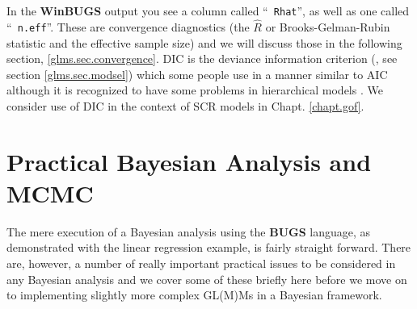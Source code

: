 


 In the {\bf WinBUGS} output you see a column called ``\mbox{\tt
   Rhat}'', as well as one called ``\mbox{\tt
   n.eff}''. These are convergence diagnostics (the $\hat{R}$ or Brooks-Gelman-Rubin statistic and the effective sample size) and we will discuss those in the following section, \ref{glms.sec.convergence}. DIC is the
deviance information criterion (\citet{spiegelhalter_etal:2002}, see section \ref{glms.sec.modsel})
 which
some people use in a manner similar to AIC although it is recognized
to have some problems in hierarchical models \citep{millar:2009}. We
consider use of DIC in the context of SCR models in Chapt. \ref{chapt.gof}.





\section{Practical Bayesian Analysis and MCMC}
\label{GLMM.sec.practical}

The mere execution of a Bayesian analysis using the {\bf BUGS} language, as demonstrated with the linear regression example, is fairly straight forward. There are, however, a number of really important practical issues to be
considered in any Bayesian analysis and we cover some of these briefly
here before we move on to implementing slightly more complex GL(M)Ms in a Bayesian framework.

